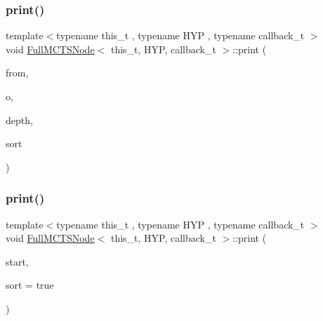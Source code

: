 \subsubsection{\texorpdfstring{print()}{print()}\hspace{0.1cm}{\footnotesize\ttfamily [1/3]}}
{\footnotesize\ttfamily template$<$typename this\+\_\+t , typename H\+YP , typename callback\+\_\+t $>$ \\
void \hyperlink{class_full_m_c_t_s_node}{Full\+M\+C\+T\+S\+Node}$<$ this\+\_\+t, H\+YP, callback\+\_\+t $>$\+::print (\begin{DoxyParamCaption}\item[{H\+YP}]{from,  }\item[{std\+::ostream \&}]{o,  }\item[{const int}]{depth,  }\item[{const bool}]{sort }\end{DoxyParamCaption})\hspace{0.3cm}{\ttfamily [inline]}}

\mbox{\label{class_full_m_c_t_s_node_afa3770ff1034e32490c850b238fd6c2b}} 
\subsubsection{\texorpdfstring{print()}{print()}\hspace{0.1cm}{\footnotesize\ttfamily [2/3]}}
{\footnotesize\ttfamily template$<$typename this\+\_\+t , typename H\+YP , typename callback\+\_\+t $>$ \\
void \hyperlink{class_full_m_c_t_s_node}{Full\+M\+C\+T\+S\+Node}$<$ this\+\_\+t, H\+YP, callback\+\_\+t $>$\+::print (\begin{DoxyParamCaption}\item[{H\+YP \&}]{start,  }\item[{const bool}]{sort = {\ttfamily true} }\end{DoxyParamCaption})\hspace{0.3cm}{\ttfamily [inline]}}

\mbox{\label{class_full_m_c_t_s_node_ace1b31902dd5a8838b52be10a224f6c4}} 

